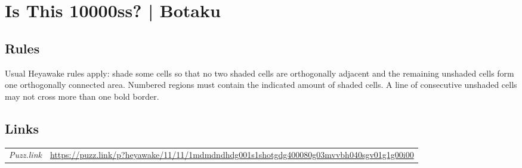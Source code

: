 \section{Is This 10000ss? | {\normalfont Botaku}}
\label{sec:20-is-this-10000ss-botaku}

\subsection*{Rules}
\begin{markdown}
Usual Heyawake rules apply: shade some cells so that no two shaded cells are orthogonally adjacent and the remaining unshaded cells form one orthogonally connected area. Numbered regions must contain the indicated amount of shaded cells. A line of consecutive unshaded cells may not cross more than one bold border.
\end{markdown}
\subsection*{Links}
\begin{tabularx}{\textwidth}{l X}
\emph{Puzz.link} & \url{https://puzz.link/p?heyawake/11/11/1mdmdndhdg001s1shotgdg400080g03mvvbh040sgv01g1g00i00} \\
\end{tabularx}
\pagebreak
